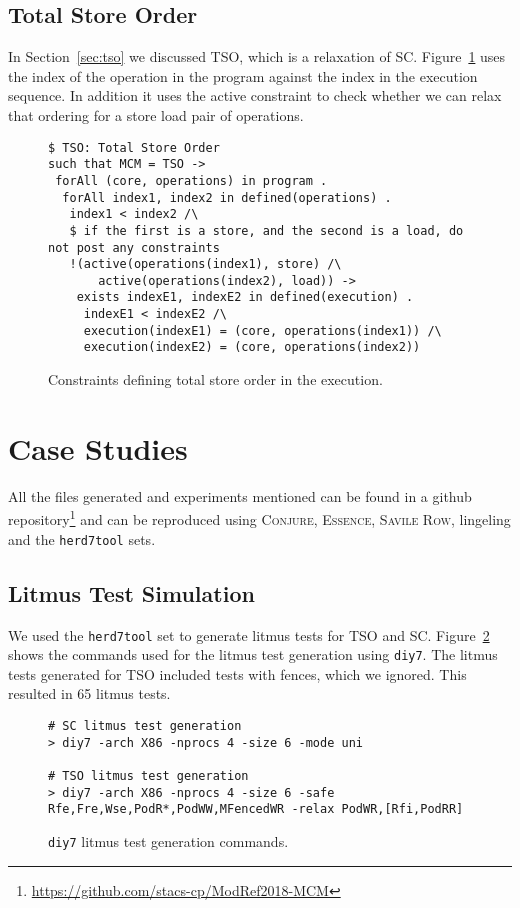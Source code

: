 \documentclass[runningheads]{llncs}
\newcommand{\essence}[0]{\textsc{Essence}}
\newcommand{\conjure}{\textsc{Conjure}\xspace}
\newcommand{\savilerow}{\textsc{Savile Row}\xspace}
\begin{document}
\subsection{Total Store Order}
In Section~\ref{sec:tso} we discussed TSO, which is a relaxation of SC.
Figure~\ref{fig:essenceTSO} uses the index of the operation in the program against the index in the execution sequence.
In addition it uses the active constraint to check whether we can relax that ordering for a store load pair of operations.

\begin{figure}
\begin{lstlisting}
$ TSO: Total Store Order
such that MCM = TSO ->
 forAll (core, operations) in program .
  forAll index1, index2 in defined(operations) .
   index1 < index2 /\
   $ if the first is a store, and the second is a load, do not post any constraints
   !(active(operations(index1), store) /\
       active(operations(index2), load)) ->
    exists indexE1, indexE2 in defined(execution) .
     indexE1 < indexE2 /\
     execution(indexE1) = (core, operations(index1)) /\
     execution(indexE2) = (core, operations(index2))
\end{lstlisting}
\caption{Constraints defining total store order in the execution.\label{fig:essenceTSO}}
\end{figure}



\section{Case Studies}
\label{sec:appl}
All the files generated and experiments mentioned can be found in a github repository\footnote{\url{https://github.com/stacs-cp/ModRef2018-MCM}} and can be reproduced using \conjure{}, \essence{}, \savilerow{}, lingeling and the {\tt{herd7tool}} sets.

\subsection{Litmus Test Simulation}
We used the {\tt{herd7tool}} set \cite{alglave2014} to generate litmus tests for TSO and SC.
Figure~\ref{fig:herd} shows the commands used for the litmus test generation using {\tt{diy7}}.
The litmus tests generated for TSO included tests with fences, which we ignored.
This resulted in 65 litmus tests.
\begin{figure}
\begin{lstlisting}
# SC litmus test generation
> diy7 -arch X86 -nprocs 4 -size 6 -mode uni

# TSO litmus test generation
> diy7 -arch X86 -nprocs 4 -size 6 -safe Rfe,Fre,Wse,PodR*,PodWW,MFencedWR -relax PodWR,[Rfi,PodRR]
\end{lstlisting}
\caption{{\tt{diy7}} litmus test generation commands.\label{fig:herd}}
\end{figure}
\end{document}
